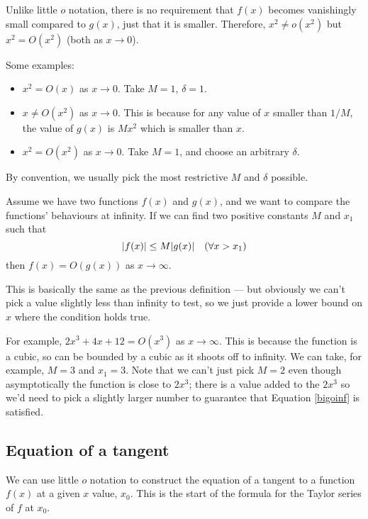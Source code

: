Unlike little \(o\) notation, there is no requirement that \(f(x)\) becomes vanishingly small compared to \(g(x)\), just that it is smaller.
Therefore, \(x^2 \neq o(x^2)\) but \(x^2 = O(x^2)\) (both as \(x \to 0\)).

Some examples:
\begin{itemize}
	\item \(x^2 = O(x)\) as \(x \to 0\).
	      Take \(M = 1\), \(\delta = 1\).
	\item \(x \neq O(x^2)\) as \(x \to 0\).
	      This is because for any value of \(x\) smaller than \(1/M\), the value of \(g(x)\) is \(Mx^2\) which is smaller than \(x\).
	\item \(x^2 = O(x^2)\) as \(x \to 0\).
	      Take \(M = 1\), and choose an arbitrary \(\delta\).
\end{itemize}

By convention, we usually pick the most restrictive \(M\) and \(\delta\) possible.

\begin{definition}
	Assume we have two functions \(f(x)\) and \(g(x)\), and we want to compare the functions' behaviours at infinity.
	If we can find two positive constants \(M\) and \(x_1\) such that
	\begin{equation}\label{bigoinf}
		\abs{f(x)} \leq M\abs{g(x)} \quad(\forall x > x_1)
	\end{equation}
	then \(f(x) = O(g(x))\) as \(x \to \infty\).
\end{definition}

This is basically the same as the previous definition --- but obviously we can't pick a value slightly less than infinity to test, so we just provide a lower bound on \(x\) where the condition holds true.

For example, \(2x^3 + 4x + 12 = O(x^3)\) as \(x \to \infty\).
This is because the function is a cubic, so can be bounded by a cubic as it shoots off to infinity.
We can take, for example, \(M = 3\) and \(x_1 = 3\).
Note that we can't just pick \(M=2\) even though asymptotically the function is close to \(2x^3\); there is a value added to the \(2x^3\) so we'd need to pick a slightly larger number to guarantee that Equation \eqref{bigoinf} is satisfied.

\subsection{Equation of a tangent}
We can use little \(o\) notation to construct the equation of a tangent to a function \(f(x)\) at a given \(x\) value, \(x_0\).
This is the start of the formula for the Taylor series of \(f\) at \(x_0\).

